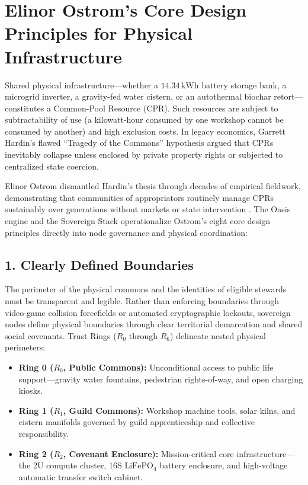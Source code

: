 \section{Elinor Ostrom's Core Design Principles for Physical Infrastructure}
\label{sec:ostrom_principles}

Shared physical infrastructure---whether a $14.34\,\mathrm{kWh}$ battery storage bank, a microgrid inverter, a gravity-fed water cistern, or an autothermal biochar retort---constitutes a Common-Pool Resource (CPR). Such resources are subject to subtractability of use (a kilowatt-hour consumed by one workshop cannot be consumed by another) and high exclusion costs. In legacy economics, Garrett Hardin's flawed ``Tragedy of the Commons'' hypothesis argued that CPRs inevitably collapse unless enclosed by private property rights or subjected to centralized state coercion.

Elinor Ostrom dismantled Hardin's thesis through decades of empirical fieldwork, demonstrating that communities of appropriators routinely manage CPRs sustainably over generations without markets or state intervention \cite{ostrom1990}. The Oasis engine and the Sovereign Stack operationalize Ostrom's eight core design principles directly into node governance and physical coordination:

\subsection{1. Clearly Defined Boundaries}
The perimeter of the physical commons and the identities of eligible stewards must be transparent and legible. Rather than enforcing boundaries through video-game collision forcefields or automated cryptographic lockouts, sovereign nodes define physical boundaries through clear territorial demarcation and shared social covenants. Trust Rings ($R_0$ through $R_6$) delineate nested physical perimeters:
\begin{itemize}
    \item \textbf{Ring 0 ($R_0$, Public Commons):} Unconditional access to public life support---gravity water fountains, pedestrian rights-of-way, and open charging kiosks.
    \item \textbf{Ring 1 ($R_1$, Guild Commons):} Workshop machine tools, solar kilns, and cistern manifolds governed by guild apprenticeship and collective responsibility.
    \item \textbf{Ring 2 ($R_2$, Covenant Enclosure):} Mission-critical core infrastructure---the 2U compute cluster, 16S $\mathrm{LiFePO}_4$ battery enclosure, and high-voltage automatic transfer switch cabinet.
\end{itemize}

